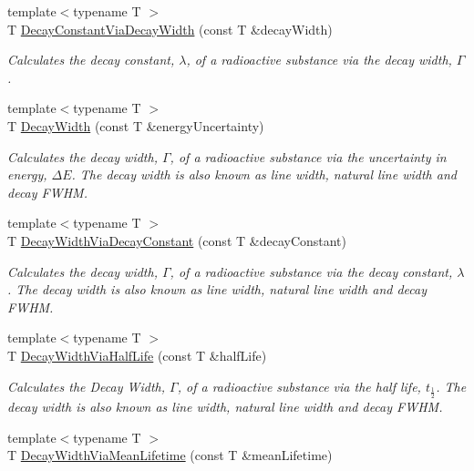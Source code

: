 \begin{DoxyCompactItemize}
{\footnotesize template$<$typename T $>$ }\\T \mbox{\hyperlink{group___e_g_x_phys-_decay_constant_gac0dc5d8a75657eaa2e939dd243fe4ba8}{Decay\+Constant\+Via\+Decay\+Width}} (const T \&decay\+Width)
\begin{DoxyCompactList}\small\item\em Calculates the decay constant, $\lambda$, of a radioactive substance via the decay width, $\Gamma$. \end{DoxyCompactList}\item 
{\footnotesize template$<$typename T $>$ }\\T \mbox{\hyperlink{group___e_g_x_phys-_decay_width_gae232ec8bb39710131be898c057a25620}{Decay\+Width}} (const T \&energy\+Uncertainty)
\begin{DoxyCompactList}\small\item\em Calculates the decay width, $\Gamma$, of a radioactive substance via the uncertainty in energy, $\Delta E$. The decay width is also known as line width, natural line width and decay F\+W\+HM. \end{DoxyCompactList}\item 
{\footnotesize template$<$typename T $>$ }\\T \mbox{\hyperlink{group___e_g_x_phys-_decay_width_ga143a666966efecc535a59bb4f36a79c6}{Decay\+Width\+Via\+Decay\+Constant}} (const T \&decay\+Constant)
\begin{DoxyCompactList}\small\item\em Calculates the decay width, $\Gamma$, of a radioactive substance via the decay constant, $\lambda$. The decay width is also known as line width, natural line width and decay F\+W\+HM. \end{DoxyCompactList}\item 
{\footnotesize template$<$typename T $>$ }\\T \mbox{\hyperlink{group___e_g_x_phys-_decay_width_ga1113224b24790a2e34032f9e90ad55c6}{Decay\+Width\+Via\+Half\+Life}} (const T \&half\+Life)
\begin{DoxyCompactList}\small\item\em Calculates the Decay Width, $\Gamma$, of a radioactive substance via the half life, $t_{\frac{1}{2}}$. The decay width is also known as line width, natural line width and decay F\+W\+HM. \end{DoxyCompactList}\item 
{\footnotesize template$<$typename T $>$ }\\T \mbox{\hyperlink{group___e_g_x_phys-_decay_width_ga0b65d991f3f3d72cf09a4a7b343a01ca}{Decay\+Width\+Via\+Mean\+Lifetime}} (const T \&mean\+Lifetime)

\end{DoxyCompactItemize}
